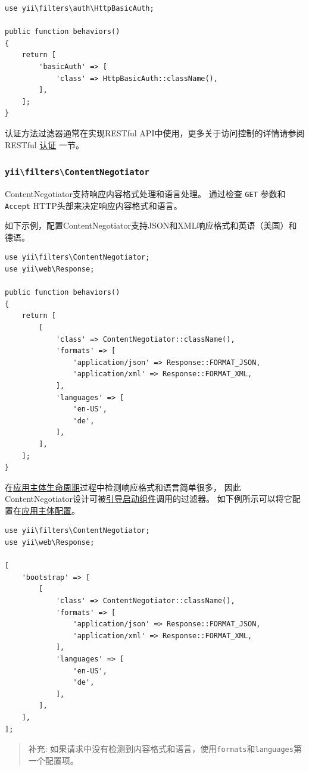 \lstset{language=php}\begin{lstlisting}
use yii\filters\auth\HttpBasicAuth;

public function behaviors()
{
    return [
        'basicAuth' => [
            'class' => HttpBasicAuth::className(),
        ],
    ];
}
\end{lstlisting}
认证方法过滤器通常在实现RESTful API中使用，更多关于访问控制的详情请参阅 RESTful \hyperref[rest-authentication.md]{认证} 一节。

\subsubsection{\texttt{yii{\allowbreak{}\textbackslash}filters{\allowbreak{}\textbackslash}ContentNegotiator} \label{structure-filters.md::content-negotiator}}
ContentNegotiator支持响应内容格式处理和语言处理。
通过检查 \lstinline|GET| 参数和 \lstinline|Accept| HTTP头部来决定响应内容格式和语言。

如下示例，配置ContentNegotiator支持JSON和XML响应格式和英语（美国）和德语。

\lstset{language=php}\begin{lstlisting}
use yii\filters\ContentNegotiator;
use yii\web\Response;

public function behaviors()
{
    return [
        [
            'class' => ContentNegotiator::className(),
            'formats' => [
                'application/json' => Response::FORMAT_JSON,
                'application/xml' => Response::FORMAT_XML,
            ],
            'languages' => [
                'en-US',
                'de',
            ],
        ],
    ];
}
\end{lstlisting}
在\hyperref[structure-applications.md::application-lifecycle]{应用主体生命周期}过程中检测响应格式和语言简单很多，
因此ContentNegotiator设计可被\hyperref[structure-applications.md::bootstrap]{引导启动组件}调用的过滤器。
如下例所示可以将它配置在\hyperref[structure-applications.md::application-configurations]{应用主体配置}。

\lstset{language=php}\begin{lstlisting}
use yii\filters\ContentNegotiator;
use yii\web\Response;

[
    'bootstrap' => [
        [
            'class' => ContentNegotiator::className(),
            'formats' => [
                'application/json' => Response::FORMAT_JSON,
                'application/xml' => Response::FORMAT_XML,
            ],
            'languages' => [
                'en-US',
                'de',
            ],
        ],
    ],
];
\end{lstlisting}
\begin{quote}补充: 如果请求中没有检测到内容格式和语言，使用\texttt{formats}和\texttt{languages}第一个配置项。

\end{quote}
